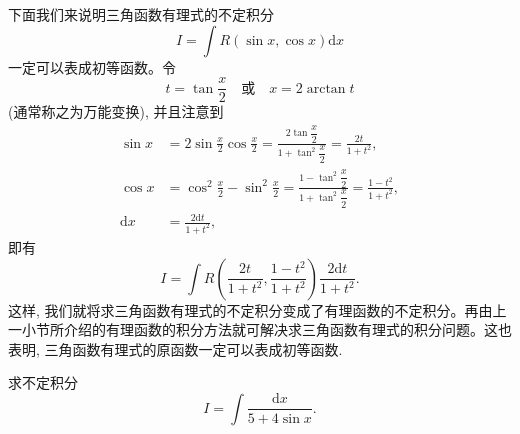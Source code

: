下面我们来说明三角函数有理式的不定积分
\[
  I=\int R(\sin x,\cos x)\mathrm dx
\]
一定可以表成初等函数。令
\[
  t=\tan\frac x2\quad\text{或}\quad x=2\arctan t
\]
(通常称之为万能变换), 并且注意到
\[
\begin{aligned}
  \sin x
  &=
  2\sin\frac x2\cos\frac x2
  =
  \frac{2\tan\dfrac x2}{1+\tan^2\dfrac x2}
  =
  \frac{2t}{1+t^2},\\
  \cos x
  &=
  \cos^2\frac x2-\sin^2\frac x2
  =
  \frac{1-\tan^2\dfrac x2}{1+\tan^2\dfrac x2}
  =
  \frac{1-t^2}{1+t^2},\\
  \mathrm dx&=\frac{2\mathrm dt}{1+t^2},
\end{aligned}
\]
即有
\[
  I=
  \int R\left(\frac{2t}{1+t^2},\frac{1-t^2}{1+t^2}\right)
  \frac{2\mathrm dt}{1+t^2}.
\]
这样, 我们就将求三角函数有理式的不定积分变成了有理函数的不定积分。再由上一小节所介绍的有理函数的积分方法就可解决求三角函数有理式的积分问题。这也表明, 三角函数有理式的原函数一定可以表成初等函数.

\begin{example}\label{example:ma-6-3-3}
求不定积分
\[
  I=\int\frac{\mathrm dx}{5+4\sin x}.
\]
\end{example}

